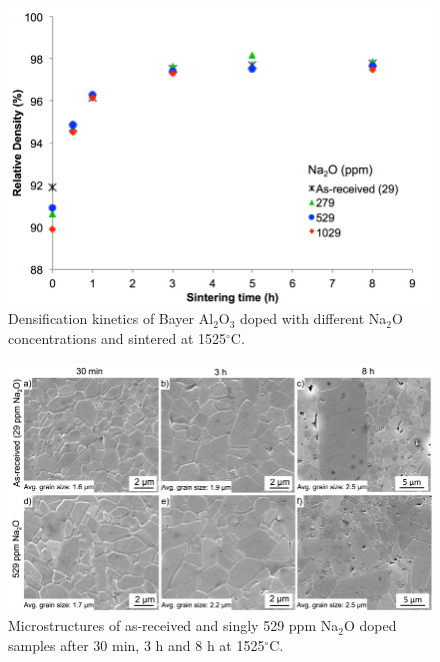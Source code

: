 \newpage
\begin{figure}[H]
	\centering
	\includegraphics[width=\textwidth]{Chapter-2/Figures/Figure3.png}
	\caption{Densification kinetics of Bayer Al$_{2}$O$_{3}$ doped with different Na$_{2}$O concentrations and sintered at 1525$^{\circ}$C.}
	\label{Ch2-figure:Figure3}
\end{figure}

\newpage
\begin{figure}[H]
	\centering
	\includegraphics[width=\textwidth]{Chapter-2/Figures/Figure4.png}
	\caption{Microstructures of as-received and singly 529 ppm Na$_{2}$O doped samples after 30 min, 3 h and 8 h at 1525$^{\circ}$C.}
	\label{Ch2-figure:Figure4}
\end{figure}

